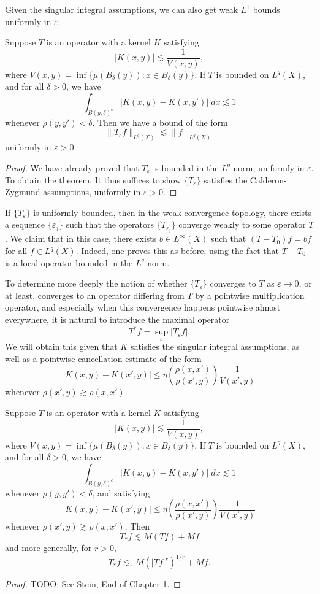 Given the singular integral assumptions, we can also get weak $L^1$ bounds uniformly in $\varepsilon$.

\begin{theorem}
    Suppose $T$ is an operator with a kernel $K$ satisfying
    \[ |K(x,y)| \lesssim \frac{1}{V(x,y)}, \]
    where $V(x,y) = \inf \{ \mu(B_\delta(y)) : x \in B_\delta(y) \}$. If $T$ is bounded on $L^q(X)$, and for all $\delta > 0$, we have
    \[ \int_{B(y,\delta)^c} |K(x,y) - K(x,y')|\; dx \lesssim 1 \]
    whenever $\rho(y,y') < \delta$. Then we have a bound of the form
    \[ \| T_\varepsilon f \|_{L^q(X)} \lesssim \| f \|_{L^q(X)} \]
    uniformly in $\varepsilon > 0$.
\end{theorem}
\begin{proof}
    We have already proved that $T_\varepsilon$ is bounded in the $L^q$ norm, uniformly in $\varepsilon$. To obtain the theorem. It thus suffices to show $\{ T_\varepsilon \}$ satisfies the Calderon-Zygmund assumptions, uniformly in $\varepsilon > 0$.
\end{proof}

If $\{ T_\varepsilon \}$ is uniformly bounded, then in the weak-convergence topology, there exists a sequence $\{ \varepsilon_j \}$ such that the operators $\{ T_{\varepsilon_j} \}$ converge weakly to some operator $T$. We claim that in this case, there exists $b \in L^\infty(X)$ such that $(T - T_0) f = bf$ for all $f \in L^q(X)$. Indeed, one proves this as before, using the fact that $T - T_0$ is a local operator bounded in the $L^q$ norm.

To determine more deeply the notion of whether $\{ T_\varepsilon \}$ converges to $T$ as $\varepsilon \to 0$, or at least, converges to an operator differing from $T$ by a pointwise multiplication operator, and especially when this convergence happens pointwise almost everywhere, it is natural to introduce the maximal operator
%
\[ T^* f = \sup_\varepsilon |T_\varepsilon f|. \]
%
We will obtain this given that $K$ satisfies the singular integral assumptions, as well as a pointwise cancellation estimate of the form
%
\[ |K(x,y) - K(x',y)| \leq \eta \left( \frac{\rho(x,x')}{\rho(x',y)} \right) \frac{1}{V(x',y)} \]
%
whenever $\rho(x',y) \gtrsim \rho(x,x')$.

\begin{theorem}
    Suppose $T$ is an operator with a kernel $K$ satisfying
    \[ |K(x,y)| \lesssim \frac{1}{V(x,y)}, \]
    where $V(x,y) = \inf \{ \mu(B_\delta(y)) : x \in B_\delta(y) \}$. If $T$ is bounded on $L^q(X)$, and for all $\delta > 0$, we have
    \[ \int_{B(y,\delta)^c} |K(x,y) - K(x,y')|\; dx \lesssim 1 \]
    whenever $\rho(y,y') < \delta$, and satisfying
    \[ |K(x,y) - K(x',y)| \leq \eta \left( \frac{\rho(x,x')}{\rho(x',y)} \right) \frac{1}{V(x',y)} \]
    whenever $\rho(x',y) \gtrsim \rho(x,x')$. Then
    \[ T_* f \lesssim M(Tf) + Mf \]
    and more generally, for $r > 0$,
    \[ T_* f \lesssim_r M(|Tf|^r)^{1/r} + Mf. \]
\end{theorem}
\begin{proof}
    TODO: See Stein, End of Chapter 1.
\end{proof}

